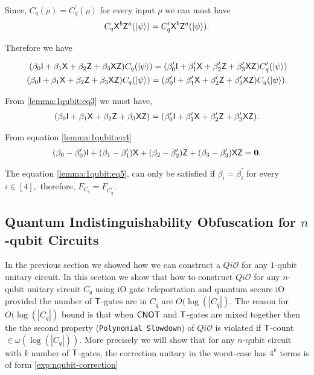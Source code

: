 Since,  $C_q (\rho)=C_q^\prime (\rho)$ for every input $\rho$ we can must have 
\begin{equation}
C_q {\sf X}^b {\sf Z}^a({\lvert}\psi\rangle)= C_q^\prime {\sf X}^b {\sf Z}^a({\lvert}\psi\rangle).
\end{equation}

Therefore we have 

\begin{equation}
\label{lemma:1qubit:eq3}
\begin{aligned}
(\beta_0 {\sf I}+\beta_1 {\sf X}+\beta_2 {\sf Z}+\beta_3 {\sf X} {\sf Z})  C_q ({\lvert}\psi\rangle)=(\beta_0^\prime {\sf I}+\beta_1^\prime {\sf X}+\beta_2^\prime {\sf Z}+\beta_3^\prime {\sf X} {\sf Z})  C_q^\prime ({\lvert}\psi\rangle)\\
(\beta_0 {\sf I}+\beta_1 {\sf X}+\beta_2 {\sf Z}+\beta_3 {\sf X} {\sf Z})  C_q ({\lvert}\psi\rangle)=(\beta_0^\prime {\sf I}+\beta_1^\prime {\sf X}+\beta_2^\prime {\sf Z}+\beta_3^\prime {\sf X} {\sf Z})  C_q({\lvert}\psi\rangle).\\
\end{aligned}
\end{equation}


From \ref{lemma:1qubit:eq3} we must have,
\begin{equation}
\label{lemma:1qubit:eq4}
\begin{aligned}
(\beta_0 {\sf I}+\beta_1 {\sf X}+\beta_2 {\sf Z}+\beta_3 {\sf X} {\sf Z}) =(\beta_0^\prime {\sf I}+\beta_1^\prime {\sf X}+\beta_2^\prime {\sf Z}+\beta_3^\prime {\sf X} {\sf Z}).\\
\end{aligned}
\end{equation}

From equation \ref{lemma:1qubit:eq4}
\begin{equation}
\label{lemma:1qubit:eq5}
\begin{aligned}
(\beta_0-\beta_0^\prime) {\sf I}+(\beta_1 -\beta_1^\prime){\sf X}+(\beta_2-\beta_2^\prime) {\sf Z}+(\beta_3-\beta^\prime_3) {\sf X} {\sf Z}={\bf 0}.
\end{aligned}
\end{equation}

The equation \ref{lemma:1qubit:eq5},  can only be satisfied if $\beta_i = \beta_i^\prime$ for every $i\in[4],$ therefore,  $F_{C_q}=F_{C_q^\prime}.$


\subsection{Quantum Indistinguishability Obfuscation for $n$-qubit Circuits}
In the previous section we showed how we can construct a $Qi\mathcal{O}$  for any $1$-qubit unitary circuit. In this section we show that how to construct  $Qi\mathcal{O}$ for any $n$-qubit unitary circuit $C_q$ using iO gate teleportation and quantum secure iO provided the number of ${\sf T}$-gates are in $C_q$ are $O(\log(|C_q|).$  The reason for $O(\log(|C_q|)$ bound is that when ${\sf CNOT}$ and ${\sf T}$-gates are mixed together then the
the second property ({\tt Polynomial Slowdown}) of $Qi\mathcal{O}$ is violated if ${\sf T}$-count $\in \omega(\log(|C_q|)).$ More precisely we will show that for any $n$-qubit circuit with $k$ number of ${\sf T}$-gates,  the correction unitary in the worst-case has $4^k$ terms is of form  \ref{exp:nqubit-correction} 

